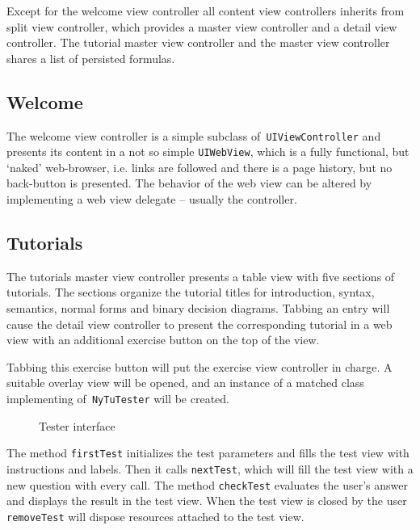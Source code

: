 Except for the welcome view controller 
all content view controllers inherits from split view controller,
which provides a master view controller and a detail view controller.
The tutorial master view controller and the \BoolTool master view controller shares a list of persisted formulas.

\subsection{Welcome}

The welcome view controller is a simple subclass of\verb+ UIViewController+ 
and presents its content in a not so simple \verb+UIWebView+,
which is a fully functional, but ‘naked’ web-browser, i.e. links are followed and there is a page history, but no back-button is presented.
The behavior of the web view can be altered by implementing a web view delegate – usually the controller.

\subsection{Tutorials}

The tutorials master view controller presents a table view with five sections of tutorials.
The sections organize the tutorial titles for 
introduction, syntax, semantics, normal forms and binary decision diagrams.
Tabbing an entry will cause the detail view controller to present the corresponding tutorial in a web view
with an additional exercise button on the top of the view.

Tabbing this exercise button will put the exercise view controller in charge. 
A suitable overlay view will be opened, 
and an instance of a matched class implementing of\verb+ NyTuTester+ will be created.

\begin{figure}[htbp]
\begin{center}
\caption{Tester interface}
\label{fig:Tester}
\end{center}
\end{figure}

The method \verb+firstTest+ initializes the test parameters and fills the test view with instructions and labels. 
Then it calls \verb+nextTest+, which will fill the test view with a new question with every call.
The method \verb+checkTest+ evaluates the user's answer and displays the result in the test view.
When the test view is closed by the user \verb+removeTest+ will dispose resources attached to the test view.

